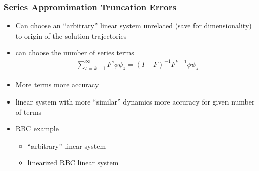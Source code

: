 \documentclass[letter]{beamer}
\begin{document}
\begin{frame}
  \frametitle{Series Appromimation Truncation Errors}
  \begin{itemize}
  \item Can choose an ``arbitrary''  linear system unrelated (save for dimensionality) to origin of the solution trajectories
  \item can choose the number of series terms
    \begin{gather}
      \label{eq:1}
\sum_{s=k+1}^{\infty} F^s \phi \psi_z = (I -F)^{-1} F^{k+1}\phi \psi_z       
    \end{gather}
  \item More terms more accuracy
  \item linear system with more ``similar'' dynamics more accuracy for given number of terms
  \item RBC example
    \begin{itemize}
    \item ``arbitrary'' linear system

  \item linearized RBC  linear system

    \end{itemize}

  \end{itemize}
\end{frame}
\end{document}
